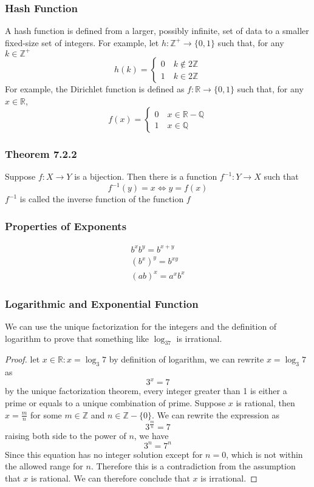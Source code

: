 \documentclass[12pt]{book}
\newcommand{\Z}{\mathbb{Z}}
\newcommand{\R}{\mathbb{R}}
\newcommand{\Q}{\mathbb{Q}}
\newcommand{\paren}[1]{\left( #1 \right)}
\newcommand{\zero}{\{0\}}
\begin{document}
\subsubsection{Hash Function}
A hash function is defined from a larger, possibly infinite, set of data to a smaller fixed-size set of integers. For example, let $h:\Z^+ \to \{0,1\}$ such that, for any $k \in \Z^+$
\[
h(k) = \begin{cases}
    0 \quad k \notin 2\Z \\
    1 \quad k \in 2\Z
\end{cases}
\]
For example, the Dirichlet function is defined as $f: \R \to \{0,1\}$ such that, for any $x \in \R$,
\[
f(x) = \begin{cases}
    0 \quad x \in \R - \Q \\
    1 \quad x \in \Q
\end{cases}
\]



\subsubsection{Theorem 7.2.2}
Suppose $f\colon X \to Y$ is a bijection. Then there is a function $f^{-1} \colon Y \to X$ such that
\[
f^{-1}(y) = x \iff y = f(x)
\]
$f^{-1}$ is called the inverse function of the function $f$


\subsubsection{Properties of Exponents}
\begin{align*}
    b^xb^y = b^{x+y}\\
    \paren{b^x}^y = b^{xy}\\
    \paren{ab}^x = a^xb^x
\end{align*}
\subsubsection{Logarithmic and Exponential Function}
We can use the unique factorization for the integers and the definition of logarithm to prove that something like $\log_37$ is irrational.
            \begin{proof}
                let $x \in \R : x = \log_3 7$ by definition of logarithm, we can rewrite $x=\log_3 7$ as 
                    \[
                    3^x = 7
                    \]
                by the unique factorization theorem, every integer greater than 1 is either a prime or equals to a unique combination of prime. Suppose $x$ is rational, then $x = \frac{m}{n}$ for some $m \in \Z$ and $n \in \Z - \zero$. We can rewrite the expression as
                    \[
                    3^\frac{m}{n} = 7
                    \]
                raising both side to the power of $n$, we have
                    \[
                    3^n = 7^n
                    \]
                Since this equation has no integer solution except for $n=0$, which is not within the allowed range for $n$. Therefore this is a contradiction from the assumption that $x$ is rational. We can therefore conclude that $x$ is irrational. 
            \end{proof}   
\end{document}
